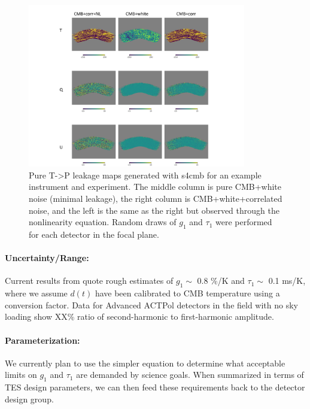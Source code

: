 \begin{figure}[h!]
\centering
\includegraphics[width=0.85\textwidth]{figures/040218_s4cmb_corr_NL.pdf}
\caption{Pure T->P leakage maps generated with s4cmb for an example instrument and experiment. The middle column is pure CMB+white noise (minimal leakage), the right column is CMB+white+correlated noise, and the left is the same as the right but observed through the nonlinearity equation. Random draws of $g_1$ and $\tau_1$ were performed for each detector in the focal plane.}
\end{figure}

\paragraph{Uncertainty/Range:}
Current results from \cite{PB1_WHWP} quote rough estimates of $g_1 \sim$ 0.8 \%/K and $\tau_1 \sim$ 0.1 ms/K, where we assume $d(t)$ have been calibrated to CMB temperature using a conversion factor. Data for Advanced ACTPol detectors in the field with no sky loading show XX\% ratio of second-harmonic to first-harmonic amplitude.

\paragraph{Parameterization:}
We currently plan to use the simpler equation to determine what acceptable limits on $g_1$ and $\tau_1$ are demanded by science goals. When summarized in terms of TES design parameters, we can then feed these requirements back to the detector design group.